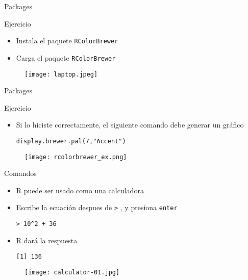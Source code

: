 \documentclass{beamer}
\begin{document}
\begin{frame}[fragile]{Packages}
\begin{block}{Ejercicio}
\begin{itemize}
\item Instala el paquete \texttt{RColorBrewer}
\item Carga el  paquete \texttt{RColorBrewer}
\end{itemize}
\end{block}
\begin{figure}[H]
\centering
\texttt{[image: laptop.jpeg]}
\end{figure}
\end{frame}

\begin{frame}[fragile]{Packages}
\begin{block}{Ejercicio}
\begin{itemize}
\item Si lo hiciste correctamente, el siguiente comando debe generar un gráfico
\begin{verbatim}
display.brewer.pal(7,"Accent")
\end{verbatim}
\end{itemize}
\end{block}
\begin{figure}[H]
\centering
\texttt{[image: rcolorbrewer\_ex.png]}
\end{figure}
\end{frame}

\begin{frame}[fragile]{Comandos}
\begin{itemize}
\item R puede ser usado como una calculadora
\item Escribe la ecuación despues de \verb=>= , y presiona \texttt{enter}
\begin{verbatim}
> 10^2 + 36
\end{verbatim}
\item R dará la respuesta
\begin{verbatim}
[1] 136
\end{verbatim}
\end{itemize}
\begin{figure}
\centering
\texttt{[image: calculator-01.jpg]}
\end{figure}
\end{frame}
\end{document}
